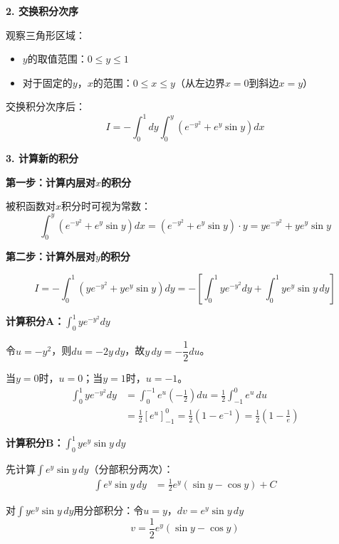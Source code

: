 \documentclass[standard]{ExBook}
\begin{document}
\begin{qitems}
\begin{bbox}
\begin{solution}
            \textbf{2. 交换积分次序}
            
            观察三角形区域：
            \begin{itemize}
                \item $y$的取值范围：$0 \le y \le 1$
                \item 对于固定的$y$，$x$的范围：$0 \le x \le y$（从左边界$x=0$到斜边$x=y$）
            \end{itemize}
            
            交换积分次序后：
            $$I = -\int_0^1 dy \int_0^y (e^{-y^2} + e^y \sin y)dx$$
            
            \textbf{3. 计算新的积分}
            
            \textbf{第一步：计算内层对$x$的积分}
            
            被积函数对$x$积分时可视为常数：
            $$\int_0^y (e^{-y^2} + e^y \sin y)dx = (e^{-y^2} + e^y \sin y) \cdot y = ye^{-y^2} + ye^y\sin y$$
            
            \textbf{第二步：计算外层对$y$的积分}
            
            $$I = -\int_0^1 (ye^{-y^2} + ye^y\sin y)dy = -\left[\int_0^1 ye^{-y^2}dy + \int_0^1 ye^y\sin y\, dy\right]$$
            
            \textbf{计算积分A：$\int_0^1 ye^{-y^2}dy$}
            
            令$u = -y^2$，则$du = -2y\,dy$，故$y\,dy = -\dfrac{1}{2}du$。
            
            当$y=0$时，$u=0$；当$y=1$时，$u=-1$。
            \begin{align*}
            \int_0^1 ye^{-y^2}dy &= \int_0^{-1} e^u \left(-\frac{1}{2}\right)du = \frac{1}{2}\int_{-1}^0 e^u\, du \\
            &= \frac{1}{2}[e^u]_{-1}^0 = \frac{1}{2}(1 - e^{-1}) = \frac{1}{2}\left(1 - \frac{1}{e}\right)
            \end{align*}
            
            \textbf{计算积分B：$\int_0^1 ye^y\sin y\, dy$}
            
            先计算$\int e^y\sin y\, dy$（分部积分两次）：
            \begin{align*}
            \int e^y\sin y\, dy &= \frac{1}{2}e^y(\sin y - \cos y) + C
            \end{align*}
            
            对$\int ye^y\sin y\, dy$用分部积分：令$u=y$，$dv=e^y\sin y\, dy$
            $$v = \frac{1}{2}e^y(\sin y - \cos y)$$
            

\end{solution}
\end{bbox}
\end{qitems}
\end{document}
